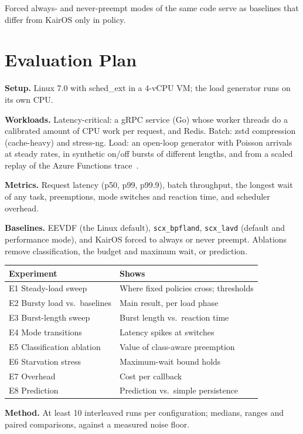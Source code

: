 \documentclass[letterpaper,twocolumn,10pt]{article}
\begin{document}
Forced always- and never-preempt modes of the same code serve as baselines
that differ from KairOS only in policy.

\section{Evaluation Plan}

\textbf{Setup.} Linux 7.0 with sched\_ext in a 4-vCPU VM; the load
generator runs on its own CPU.

\textbf{Workloads.} Latency-critical: a gRPC service (Go) whose worker
threads do a calibrated amount of CPU work per request, and Redis. Batch:
zstd compression (cache-heavy) and stress-ng. Load: an open-loop generator
with Poisson arrivals at steady rates, in synthetic on/off bursts of
different lengths, and from a scaled replay of the Azure Functions
trace~\cite{azure,shahrad}.

\textbf{Metrics.} Request latency (p50, p99, p99.9), batch throughput,
the longest wait of any task, preemptions, mode switches and reaction time,
and scheduler overhead.

\textbf{Baselines.} EEVDF (the Linux default), \texttt{scx\_bpfland},
\texttt{scx\_lavd} (default and performance mode), and KairOS forced to
always or never preempt. Ablations remove classification, the budget and
maximum wait, or prediction.

\begin{table}[h]
\centering
\small
\begin{tabular}{@{}ll@{}}
\hline
Experiment & Shows \\
\hline
E1 Steady-load sweep & Where fixed policies cross; thresholds \\
E2 Bursty load vs.\ baselines & Main result, per load phase \\
E3 Burst-length sweep & Burst length vs.\ reaction time \\
E4 Mode transitions & Latency spikes at switches \\
E5 Classification ablation & Value of class-aware preemption \\
E6 Starvation stress & Maximum-wait bound holds \\
E7 Overhead & Cost per callback \\
E8 Prediction & Prediction vs.\ simple persistence \\
\hline
\end{tabular}
\end{table}

\textbf{Method.} At least 10 interleaved runs per configuration; medians,
ranges and paired comparisons, against a measured noise floor.
\end{document}
